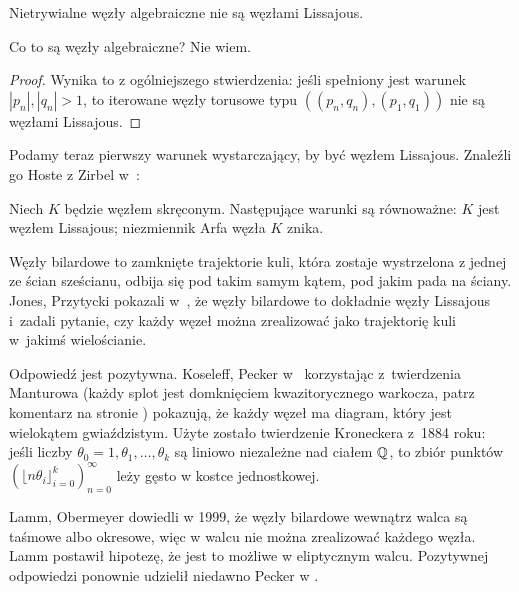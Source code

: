 \begin{corollary}
    Nietrywialne węzły algebraiczne nie są węzłami Lissajous.
\end{corollary}

Co to są węzły algebraiczne?
Nie wiem.

\begin{proof}
    Wynika to z ogólniejszego stwierdzenia: jeśli spełniony jest warunek $|p_n|, |q_n| > 1$, to iterowane węzły torusowe typu $((p_n, q_n), (p_1, q_1))$ nie są węzłami Lissajous.
\end{proof}

Podamy teraz pierwszy warunek wystarczający, by być węzłem Lissajous.
Znaleźli go Hoste z Zirbel w~\cite{zirbel06}:
%
%

\begin{proposition}
%
%
    Niech $K$ będzie węzłem skręconym.
    Następujące warunki są równoważne: $K$ jest węzłem Lissajous; niezmiennik Arfa węzła $K$ znika.
\end{proposition}

Węzły bilardowe to zamknięte trajektorie kuli, która zostaje wystrzelona z jednej ze ścian sześcianu, odbija się pod takim samym kątem, pod jakim pada na ściany.
%
Jones, Przytycki pokazali w~\cite{jones98}, że węzły bilardowe to dokładnie węzły Lissajous i~zadali pytanie, czy każdy węzeł można zrealizować jako trajektorię kuli w~jakimś wielościanie.
%
%

Odpowiedź jest pozytywna.
Koseleff, Pecker w~\cite{koseleff14} korzystając z~twierdzenia Manturowa
%
%
%
(każdy splot jest domknięciem kwazitorycznego warkocza, patrz komentarz na stronie \pageref{thm:alexander})
pokazują, że każdy węzeł ma diagram, który jest wielokątem gwiaździstym.
Użyte zostało twierdzenie Kroneckera z~1884 roku: jeśli liczby $\theta_0 = 1, \theta_1, \ldots, \theta_k$ są liniowo niezależne nad ciałem $\mathbb Q$, to zbiór punktów $(\lfloor n\theta_i \rfloor_{i=0}^k)_{n=0}^\infty$ leży gęsto w kostce jednostkowej.

Lamm, Obermeyer dowiedli w 1999, że węzły bilardowe wewnątrz walca są taśmowe albo okresowe, więc w walcu nie można zrealizować każdego węzła.
%
%
%
%
Lamm postawił hipotezę, że jest to możliwe w eliptycznym walcu.
Pozytywnej odpowiedzi ponownie udzielił niedawno Pecker w \cite{pecker12}.
%



